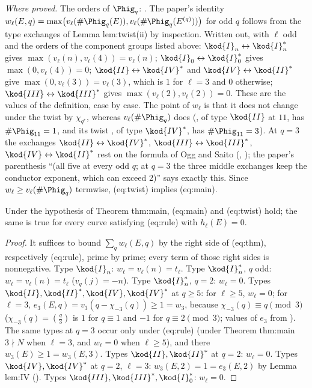 \begin{sloppypar}
\noindent\emph{Where proved.} The orders of $\Phig_q$: . The paper's identity $w_\ell(E,q)=\max\bigl(v_\ell(\#\Phig_q(E)),v_\ell(\#\Phig_q(E^{(q)}))\bigr)$ for odd $q$
follows from the type exchanges of Lemma lem:twist(ii) by inspection. Written out, with $\ell$ odd and the orders of the component groups listed above: $\kod{I}_n\leftrightarrow\kod{I}_n^*$ gives
$\max(v_\ell(n),v_\ell(4))=v_\ell(n)$; $\kod{I}_0\leftrightarrow\kod{I}_0^*$ gives $\max(0,v_\ell(4))=0$; $\kod{II}\leftrightarrow\kod{IV}^*$ and $\kod{IV}\leftrightarrow\kod{II}^*$ give $\max(0,v_\ell(3))=v_\ell(3)$, which is $1$ for $\ell=3$ and $0$
otherwise; $\kod{III}\leftrightarrow\kod{III}^*$ gives $\max(v_\ell(2),v_\ell(2))=0$. These are the values of the definition, case by case. The point of $w_\ell$ is that it does not change under the
twist by $\chi_{q^*}$, whereas $v_\ell(\#\Phig_q)$ does (, of type $\kod{II}$ at $11$, has $\#\Phig_{11}=1$, and its twist , of type $\kod{IV}^*$, has $\#\Phig_{11}=3$). At $q=3$
the exchanges $\kod{II}\leftrightarrow\kod{IV}^*$, $\kod{III}\leftrightarrow\kod{III}^*$, $\kod{IV}\leftrightarrow\kod{II}^*$ rest on the formula of Ogg and Saito (, ); the paper's
parenthesis ``(all five at every odd $q$; at $q=3$ the three middle exchanges keep the conductor exponent, which can exceed $2$)'' says exactly this. Since
$w_\ell\ge v_\ell(\#\Phig_q)$ termwise, (eq:twist) implies (eq:main).

\begin{proposition}\label{prop:paper:forms}
Under the hypothesis of Theorem thm:main, (eq:main) and (eq:twist) hold; the same is true for every curve satisfying (eq:rule) with $h_\ell(E)=0$.
\end{proposition}

\begin{proof}
It suffices to bound $\sum_qw_\ell(E,q)$ by the right side of (eq:thm), respectively (eq:rule), prime by prime; every term of those right sides is
nonnegative. Type $\kod{I}_n$: $w_\ell=v_\ell(n)=t_\ell$. Type $\kod{I}_n^*$, $q$ odd: $w_\ell=v_\ell(n)=t_\ell$ ($v_q(j)=-n$). Type $\kod{I}_n^*$, $q=2$: $w_\ell=0$. Types $\kod{II},\kod{II}^*,\kod{IV},\kod{IV}^*$ at
$q\ge5$: for $\ell\ge5$, $w_\ell=0$; for $\ell=3$, $e_3(E,q)=v_3(q-\chi_{-3}(q))\ge1=w_3$, because $\chi_{-3}(q)\equiv q\pmod3$ ($\chi_{-3}(q)=(\frac q3)$ is $1$ for $q\equiv1$ and $-1$ for
$q\equiv2\pmod3$; values of $e_3$ from ). The same types at $q=3$ occur only
under (eq:rule) (under Theorem thm:main $3\nmid N$ when $\ell=3$, and $w_\ell=0$ when $\ell\ge5$), and there $w_3(E)\ge1=w_3(E,3)$. Types $\kod{II},\kod{II}^*$ at $q=2$: $w_\ell=0$. Types
$\kod{IV},\kod{IV}^*$ at $q=2$, $\ell=3$: $w_3(E,2)=1=e_3(E,2)$ by Lemma lem:IV (). Types $\kod{III},\kod{III}^*,\kod{I}_0^*$: $w_\ell=0$.
\end{proof}


\end{sloppypar}
